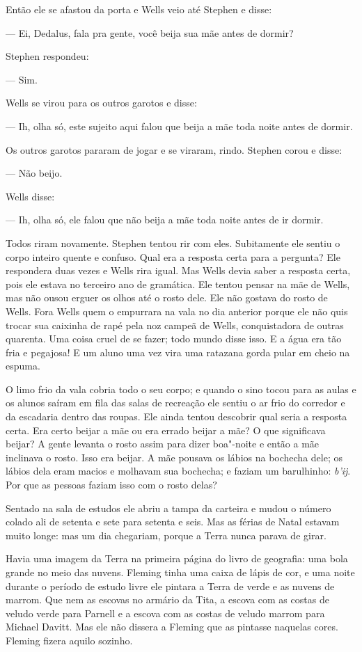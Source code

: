 Então ele se afastou da porta e Wells veio até Stephen e disse:

 --- Ei, Dedalus, fala pra gente, você beija sua mãe antes de dormir?

Stephen respondeu:

 --- Sim.

Wells se virou para os outros garotos e disse:

 --- Ih, olha só, este sujeito aqui falou que beija a mãe toda noite antes
de dormir.

Os outros garotos pararam de jogar e se viraram, rindo. Stephen corou e
disse:

 --- Não beijo.

Wells disse:

 --- Ih, olha só, ele falou que não beija a mãe toda noite antes de ir
dormir.

Todos riram novamente. Stephen tentou rir com eles. Subitamente ele
sentiu o corpo inteiro quente e confuso. Qual era a resposta certa para
a pergunta? Ele respondera duas vezes e Wells rira igual. Mas Wells
devia saber a resposta certa, pois ele estava no terceiro ano de
gramática. Ele tentou pensar na mãe de Wells, mas não ousou erguer os
olhos até o rosto dele. Ele não gostava do rosto de Wells. Fora Wells
quem o empurrara na vala no dia anterior porque ele não quis trocar sua
caixinha de rapé pela noz campeã de Wells, conquistadora de outras quarenta. 
Uma coisa cruel de se fazer; todo mundo disse isso. E a água
era tão fria e pegajosa! E um aluno uma vez vira uma ratazana gorda
pular em cheio na espuma.

O limo frio da vala cobria todo o seu corpo; e quando o sino tocou para as
aulas e os alunos saíram em fila das salas de recreação ele sentiu o ar
frio do corredor e da escadaria dentro das roupas. Ele ainda tentou
descobrir qual seria a resposta certa. Era certo beijar a mãe ou era
errado beijar a mãe? O que significava beijar? A gente levanta o rosto
assim para dizer boa"-noite e então a mãe inclinava o rosto. Isso era 
beijar. A mãe pousava os lábios na bochecha dele; os lábios dela eram
macios e molhavam sua bochecha; e faziam um barulhinho: \textit{b'ij}.
Por que as pessoas faziam isso com o rosto delas?

Sentado na sala de estudos ele abriu a tampa da carteira e mudou o
número colado ali de setenta e sete para setenta e seis. Mas as férias
de Natal estavam muito longe: mas um dia chegariam, porque a Terra
nunca parava de girar.

Havia uma imagem da Terra na primeira página do livro de geografia: uma
bola grande no meio das nuvens. Fleming tinha uma caixa de lápis de
cor, e uma noite durante o período de estudo livre ele pintara a Terra
de verde e as nuvens de marrom. Que nem as escovas no armário da Tita,
a escova com as costas de veludo verde para Parnell e a escova com as
costas de veludo marrom para Michael Davitt. Mas ele não dissera a
Fleming que as pintasse naquelas cores. Fleming fizera aquilo sozinho.


